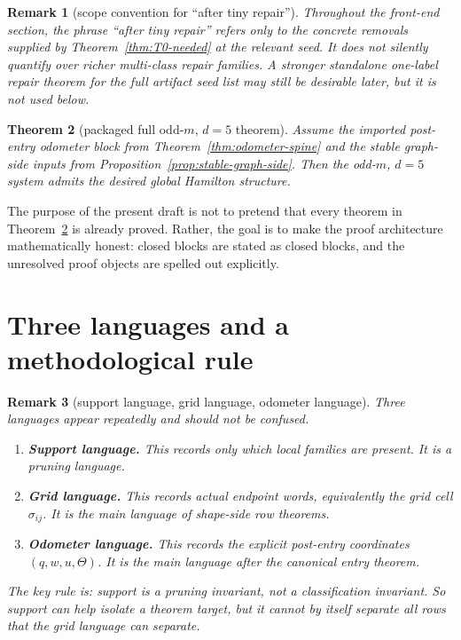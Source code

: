 \documentclass[11pt]{article}
\newtheorem{theorem}{Theorem}[section]
\newtheorem{remark}[theorem]{Remark}
\newcommand{\sig}[2]{\sigma_{#1#2}}
\begin{document}
\begin{remark}[scope convention for ``after tiny repair'']
Throughout the front-end section, the phrase ``after tiny repair'' refers only
to the concrete removals supplied by Theorem~\ref{thm:T0-needed} at the relevant
seed.  It does not silently quantify over richer multi-class repair families.
A stronger standalone one-label repair theorem for the full artifact seed list
may still be desirable later, but it is not used below.
\end{remark}

\begin{theorem}[packaged full odd-$m$, $d=5$ theorem]
\label{thm:conditional-full}
Assume the imported post-entry odometer block from
Theorem~\ref{thm:odometer-spine} and the stable graph-side inputs from
Proposition~\ref{prop:stable-graph-side}.
Then the odd-$m$, $d=5$ system admits the desired global Hamilton structure.
\end{theorem}

The purpose of the present draft is not to pretend that every theorem in
Theorem~\ref{thm:conditional-full} is already proved.
Rather, the goal is to make the proof architecture mathematically honest:
closed blocks are stated as closed blocks, and the unresolved proof objects are
spelled out explicitly.

\section{Three languages and a methodological rule}

\begin{remark}[support language, grid language, odometer language]
Three languages appear repeatedly and should not be confused.
\begin{enumerate}[label=\textup{(\arabic*)},leftmargin=2.8em]
\item \textbf{Support language.}
      This records only which local families are present.
      It is a pruning language.
\item \textbf{Grid language.}
      This records actual endpoint words, equivalently the grid cell
      \(\sig{i}{j}\).
      It is the main language of shape-side row theorems.
\item \textbf{Odometer language.}
      This records the explicit post-entry coordinates
      \((q,w,u,\Theta)\).
      It is the main language after the canonical entry theorem.
\end{enumerate}
The key rule is:
\emph{support is a pruning invariant, not a classification invariant.}
So support can help isolate a theorem target, but it cannot by itself separate
all rows that the grid language can separate.
\end{remark}
\end{document}
